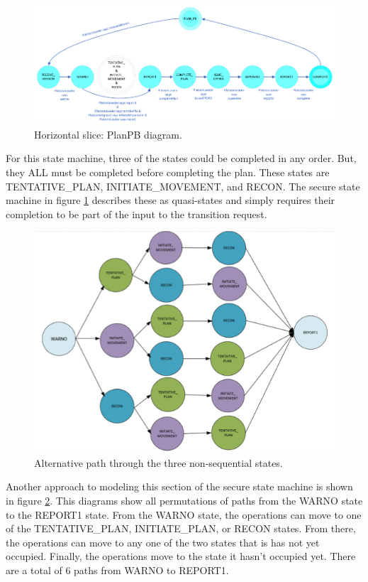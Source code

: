 \documentclass[../../main/main.tex]{subfiles}
\begin{document}
 \begin{figure}[h!]
\centering
\includegraphics[width=\textwidth]{../figures/ssmPlanPBDiagram}
\caption{\label{ssmPlanPBDiagram2} Horizontal slice: PlanPB diagram.}
\end{figure}

For this state machine, three of the states could be completed in any order.  But, they ALL must be completed before completing the plan.  These states are TENTATIVE_PLAN, INITIATE_MOVEMENT, and RECON.   The secure state machine in figure \ref{ssmPlanPBDiagram2} describes these as quasi-states and simply requires their completion to be part of the input to the transition request.  


 \begin{figure}[h!]
\centering
\includegraphics[width=\textwidth]{../figures/planAlt}
\caption{\label{planAlt} Alternative path through the three non-sequential states.}
\end{figure}

Another approach to modeling this section of the secure state machine is shown in figure \ref{planAlt}.  This diagrams show all permutations of paths from the WARNO state to the REPORT1 state. From the WARNO state, the operations can move to one of the TENTATIVE_PLAN, INITIATE_PLAN, or RECON states.  From there, the operations can move to any one of the two states that is has not yet occupied.  Finally, the operations move to the state it hasn't occupied yet.  There are a total of 6 paths from WARNO to REPORT1.
\end{document}
